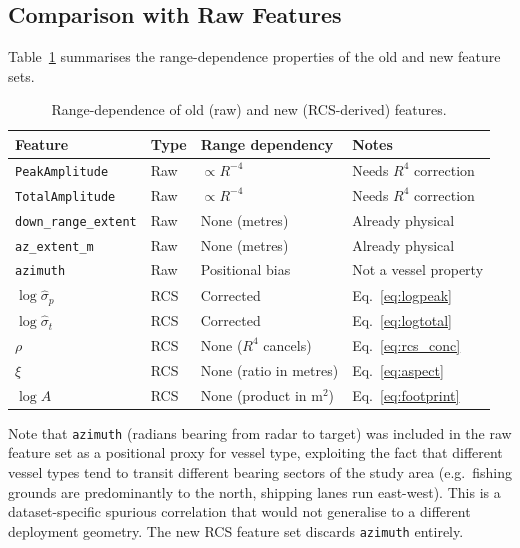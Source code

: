 \documentclass[journal]{IEEEtran}
\begin{document}
\subsection{Comparison with Raw Features}

Table~\ref{tab:feature_comparison} summarises the range-dependence
properties of the old and new feature sets.

\begin{table}[H]
\centering
\caption{Range-dependence of old (raw) and new (RCS-derived) features.}
\label{tab:feature_comparison}
\begin{tabular}{llll}
\toprule
\textbf{Feature} & \textbf{Type} & \textbf{Range dependency} & \textbf{Notes} \\
\midrule
\texttt{PeakAmplitude}   & Raw    & $\propto R^{-4}$          & Needs $R^4$ correction \\
\texttt{TotalAmplitude}  & Raw    & $\propto R^{-4}$          & Needs $R^4$ correction \\
\texttt{down\_range\_extent} & Raw & None (metres)            & Already physical \\
\texttt{az\_extent\_m}   & Raw    & None (metres)             & Already physical \\
\texttt{azimuth}         & Raw    & Positional bias           & Not a vessel property \\
\midrule
$\log\hat{\sigma}_p$     & RCS    & Corrected                 & Eq.~\ref{eq:logpeak} \\
$\log\hat{\sigma}_t$     & RCS    & Corrected                 & Eq.~\ref{eq:logtotal} \\
$\rho$                   & RCS    & None ($R^4$ cancels)      & Eq.~\ref{eq:rcs_conc} \\
$\xi$                    & RCS    & None (ratio in metres)    & Eq.~\ref{eq:aspect} \\
$\log A$                 & RCS    & None (product in m$^2$)   & Eq.~\ref{eq:footprint} \\
\bottomrule
\end{tabular}
\end{table}

Note that \texttt{azimuth} (radians bearing from radar to target) was
included in the raw feature set as a positional proxy for vessel type,
exploiting the fact that different vessel types tend to transit
different bearing sectors of the study area (e.g.\ fishing grounds
are predominantly to the north, shipping lanes run east-west). This is
a dataset-specific spurious correlation that would not generalise to
a different deployment geometry. The new RCS feature set discards
\texttt{azimuth} entirely.
\end{document}
